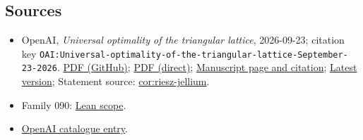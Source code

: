 \documentclass[11pt]{article}
\begin{document}
\subsection{Sources}
\begin{itemize}
\item OpenAI, \emph{Universal optimality of the triangular lattice}, 2026-09-23; citation key \texttt{OAI:Universal-optimality-of-the-triangular-lattice-September-23-2026}. \href{https://github.com/openai/math/blob/adc7f1241b42e322a6451854ab7e4b4c146bf78a/preprints/Universal-optimality-of-the-triangular-lattice-September-23-2026/paper.pdf}{PDF (GitHub)}; \href{https://github.com/openai/math/raw/adc7f1241b42e322a6451854ab7e4b4c146bf78a/preprints/Universal-optimality-of-the-triangular-lattice-September-23-2026/paper.pdf}{PDF (direct)}; \href{https://github.com/openai/math/blob/adc7f1241b42e322a6451854ab7e4b4c146bf78a/preprints/Universal-optimality-of-the-triangular-lattice-September-23-2026/README.md}{Manuscript page and citation}; \href{https://github.com/openai/math/blob/main/preprints/Universal-optimality-of-the-triangular-lattice-September-23-2026/paper.pdf}{Latest version}; Statement source: \href{https://github.com/openai/math/blob/adc7f1241b42e322a6451854ab7e4b4c146bf78a/preprints/Universal-optimality-of-the-triangular-lattice-September-23-2026/build/sections/08-renormalized-jellium.tex\#L133}{cor:riesz-jellium}.
\item Family 090: \href{https://github.com/openai/math/blob/adc7f1241b42e322a6451854ab7e4b4c146bf78a/lean/docs/090.md}{Lean scope}.
\item \href{https://github.com/openai/math/blob/adc7f1241b42e322a6451854ab7e4b4c146bf78a/CONTENTS.md}{OpenAI catalogue entry}.
\end{itemize}
\end{document}
